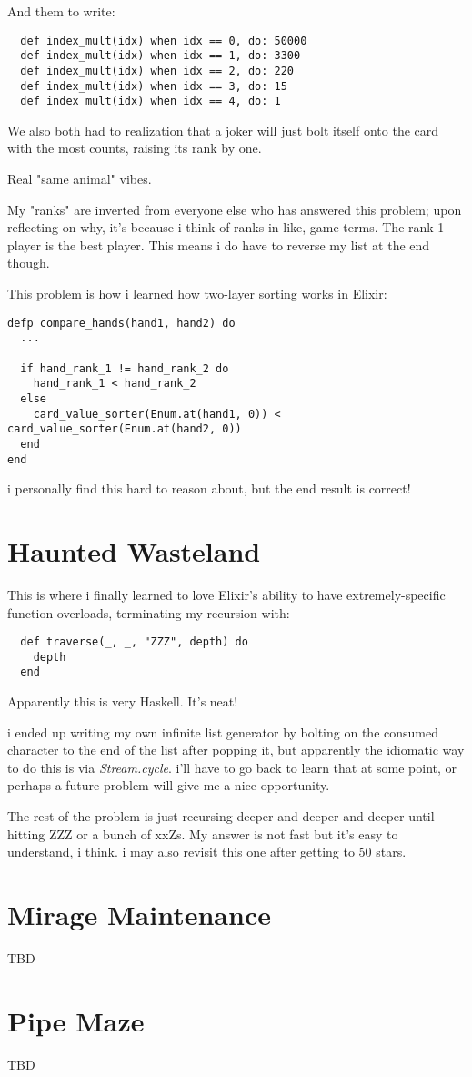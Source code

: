 \documentclass{article}
\begin{document}
And them to write:
\begin{verbatim}
  def index_mult(idx) when idx == 0, do: 50000
  def index_mult(idx) when idx == 1, do: 3300
  def index_mult(idx) when idx == 2, do: 220
  def index_mult(idx) when idx == 3, do: 15
  def index_mult(idx) when idx == 4, do: 1
\end{verbatim}

We also both had to realization that a joker will just bolt itself onto the card with the most counts, raising its rank by one.

Real "same animal" vibes.

My "ranks" are inverted from everyone else who has answered this problem; upon reflecting on why, it's because i think of ranks in like, game terms. The rank 1 player is the best player. This means i do have to reverse my list at the end though.

This problem is how i learned how two-layer sorting works in Elixir:
\begin{verbatim}
defp compare_hands(hand1, hand2) do
  ...

  if hand_rank_1 != hand_rank_2 do
    hand_rank_1 < hand_rank_2
  else
    card_value_sorter(Enum.at(hand1, 0)) < card_value_sorter(Enum.at(hand2, 0))
  end
end
\end{verbatim}

i personally find this hard to reason about, but the end result is correct!

\section{Haunted Wasteland}

This is where i finally learned to love Elixir's ability to have extremely-specific function overloads, terminating my recursion with:
\begin{verbatim}
  def traverse(_, _, "ZZZ", depth) do
    depth
  end
\end{verbatim}

Apparently this is very Haskell. It's neat!

i ended up writing my own infinite list generator by bolting on the consumed character to the end of the list after popping it, but apparently the idiomatic way to do this is via \textit{Stream.cycle}. i'll have to go back to learn that at some point, or perhaps a future problem will give me a nice opportunity.

The rest of the problem is just recursing deeper and deeper and deeper until hitting ZZZ or a bunch of xxZs. My answer is not fast but it's easy to understand, i think. i may also revisit this one after getting to 50 stars.

\section{Mirage Maintenance}
TBD
\section{Pipe Maze}
TBD
\end{document}
